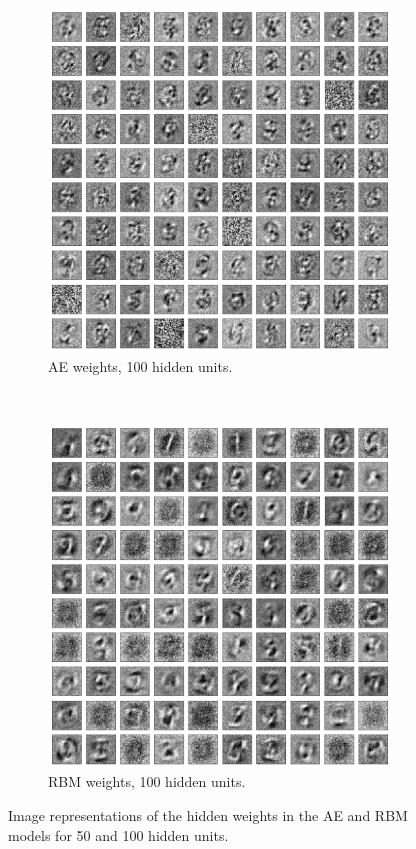\documentclass{article}
\begin{document}
\begin{figure}[!ht]
\begin{subfigure}[t]{0.47\textwidth}
    \includegraphics[width=\textwidth]{../plots/3_1_2/ae_last_layer_100_components.png}
    \caption{AE weights, 100 hidden units.}
    \label{fig:w100ae}
  \end{subfigure}
  \addtocounter{subfigure}{1}
  ~
  \begin{subfigure}[t]{0.47\textwidth}
    \centering
    \includegraphics[width=\textwidth]{../plots/3_1_2/rbm_last_layer_100_components.png}
    \caption{RBM weights, 100 hidden units.}
    \label{fig:w100rbm}
  \end{subfigure}
  \caption{
    Image representations of the hidden weights in the AE and RBM models
    for 50 and 100 hidden units.
  }
  \label{fig:hiddenweights}
\end{figure}
\end{document}
